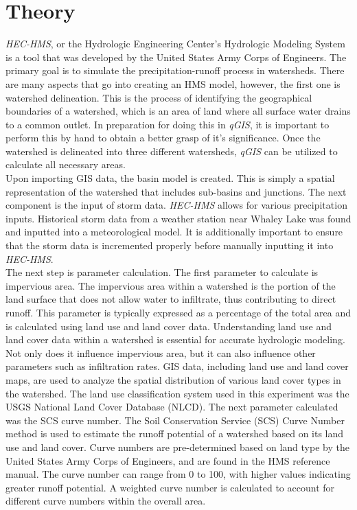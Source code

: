 \documentclass{article}
\begin{document}
\section{Theory}
\emph{HEC-HMS}, or the Hydrologic Engineering Center's Hydrologic Modeling System is a tool that was developed by the United States Army Corps of Engineers. The primary goal is to simulate the precipitation-runoff process in watersheds. There are many aspects that go into creating an HMS model, however, the first one is watershed delineation. This is the process of identifying the geographical boundaries of a watershed, which is an area of land where all surface water drains to a common outlet. In preparation for doing this in \emph{qGIS}, it is important to perform this by hand to obtain a better grasp of it's significance. Once the watershed is delineated into three different watersheds, \emph{qGIS} can be utilized to calculate all necessary areas. \\
\indent Upon importing GIS data, the basin model is created. This is simply a spatial representation of the watershed that includes sub-basins and junctions. The next component is the input of storm data. \emph{HEC-HMS} allows for various precipitation inputs. Historical storm data from a weather station near Whaley Lake was found and inputted into a meteorological model. It is additionally important to ensure that the storm data is incremented properly before manually inputting it into \emph{HEC-HMS}.\\
\indent The next step is parameter calculation. The first parameter to calculate is impervious area. The impervious area within a watershed is the portion of the land surface that does not allow water to infiltrate, thus contributing to direct runoff. This parameter is typically expressed as a percentage of the total area and is calculated using land use and land cover data. Understanding land use and land cover data within a watershed is essential for accurate hydrologic modeling. Not only does it influence impervious area, but it can also influence other parameters such as infiltration rates. GIS data, including land use and land cover maps, are used to analyze the spatial distribution of various land cover types in the watershed. The land use classification system used in this experiment was the USGS National Land Cover Database (NLCD). The next parameter calculated was the SCS curve number. The Soil Conservation Service (SCS) Curve Number method is used to estimate the runoff potential of a watershed based on its land use and land cover. Curve numbers are pre-determined based on land type by the United States Army Corps of Engineers, and are found in the HMS reference manual. The curve number can range from 0 to 100, with higher values indicating greater runoff potential. A weighted curve number is calculated to account for different curve numbers within the overall area.\\
\end{document}
